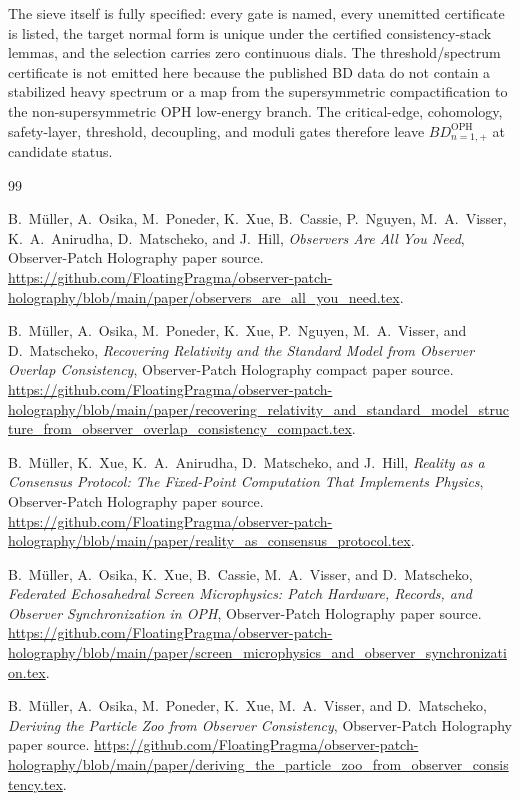 \documentclass[11pt]{article}
\theoremstyle{remark}
\theoremstyle{plain}
\newcommand{\OPH}{\mathrm{OPH}}
\begin{document}
The sieve itself is fully specified: every gate is named, every unemitted certificate is listed,
the target normal form is unique under the certified consistency-stack lemmas, and the selection
carries zero continuous dials. The threshold/spectrum certificate is not emitted here because the
published BD data do not
contain a stabilized heavy spectrum or a map from the supersymmetric compactification to the
non-supersymmetric OPH low-energy branch. The critical-edge, cohomology, safety-layer, threshold,
decoupling, and moduli gates therefore leave \(BD_{n=1,+}^{\OPH}\) at candidate status.

\begin{thebibliography}{99}

B.\ M\"uller, A.\ Osika, M.\ Poneder, K.\ Xue, B.\ Cassie, P.\ Nguyen, M.\ A.\ Visser, K.\ A.\ Anirudha, D.\ Matscheko, and J.\ Hill,
\emph{Observers Are All You Need},
Observer-Patch Holography paper source.
\url{https://github.com/FloatingPragma/observer-patch-holography/blob/main/paper/observers_are_all_you_need.tex}.

B.\ M\"uller, A.\ Osika, M.\ Poneder, K.\ Xue, P.\ Nguyen, M.\ A.\ Visser, and D.\ Matscheko,
\emph{Recovering Relativity and the Standard Model from Observer Overlap Consistency},
Observer-Patch Holography compact paper source.
\url{https://github.com/FloatingPragma/observer-patch-holography/blob/main/paper/recovering_relativity_and_standard_model_structure_from_observer_overlap_consistency_compact.tex}.

B.\ M\"uller, K.\ Xue, K.\ A.\ Anirudha, D.\ Matscheko, and J.\ Hill,
\emph{Reality as a Consensus Protocol: The Fixed-Point Computation That Implements Physics},
Observer-Patch Holography paper source.
\url{https://github.com/FloatingPragma/observer-patch-holography/blob/main/paper/reality_as_consensus_protocol.tex}.

B.\ M\"uller, A.\ Osika, K.\ Xue, B.\ Cassie, M.\ A.\ Visser, and D.\ Matscheko,
\emph{Federated Echosahedral Screen Microphysics: Patch Hardware, Records, and Observer Synchronization in OPH},
Observer-Patch Holography paper source.
\url{https://github.com/FloatingPragma/observer-patch-holography/blob/main/paper/screen_microphysics_and_observer_synchronization.tex}.

B.\ M\"uller, A.\ Osika, M.\ Poneder, K.\ Xue, M.\ A.\ Visser, and D.\ Matscheko,
\emph{Deriving the Particle Zoo from Observer Consistency},
Observer-Patch Holography paper source.
\url{https://github.com/FloatingPragma/observer-patch-holography/blob/main/paper/deriving_the_particle_zoo_from_observer_consistency.tex}.


\end{thebibliography}
\end{document}
